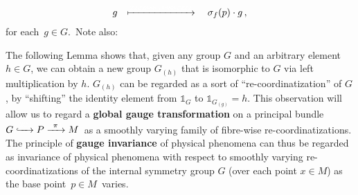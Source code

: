 \begin{remark}
\begin{equation*}
\begin{array}{ccl}
g
&
\xmapsto{{\color{white}2222888448882222}}
&
{\color{white}.} \sigma_{f}(p) \cdot g\,,
\end{array}
\end{equation*}
for each \,$g \in G$.\,
Note also:
\begin{center}
\end{center}
\end{remark}


\vskip 0.5cm
\begin{remark}
\label{FibrewiseRecoordinatization}
\mbox{}
\vskip 0.05cm
\noindent
The following Lemma shows that, given any group $G$ and an arbitrary element $h \in G$,
we can obtain a new group $G_{(h)}$ that is isomorphic to $G$ via {\color{red}left} multiplication by $h$.
$G_{(h)}$ can be regarded as a sort of {\color{red}``re-coordinatization''} of $G$,
by ``shifting'' the identity element from $\mathds{1}_{G}$ to $\mathds{1}_{G_{(g)}} = h$.
This observation will allow us to regard a \textbf{global gauge transformation}
on a principal bundle
\,$G \xhookrightarrow{{\color{white}222}} P \xrightarrow{{\color{white}2}\pi{\color{white}2}} M$\,
as a smoothly varying family of fibre-wise re-coordinatizations.
The principle of \textbf{\color{red}gauge invariance} of physical phenomena can thus be regarded as
invariance of physical phenomena with respect to smoothly varying re-coordinatizations
of the internal symmetry group $G$ (over each point $x \in M$) as the base point \,$p \in M$\, varies.
\end{remark}



